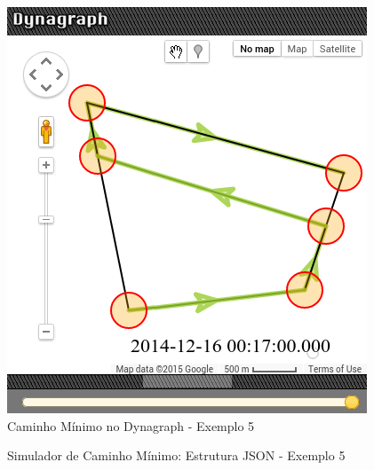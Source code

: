 \begin{figure}[htbp]
 \includegraphics[width=.35\textwidth]{figuras/validacao/dyn5f.png}
\caption{Caminho Mínimo no Dynagraph - Exemplo 5}
\label{fig:dyn5}
\end{figure}
\FloatBarrier


\begin{figure}[htbp]
  \caption{Simulador de Caminho Mínimo: Estrutura JSON - Exemplo 5}
  \label{fig:jsondyn5}
\end{figure}
\FloatBarrier